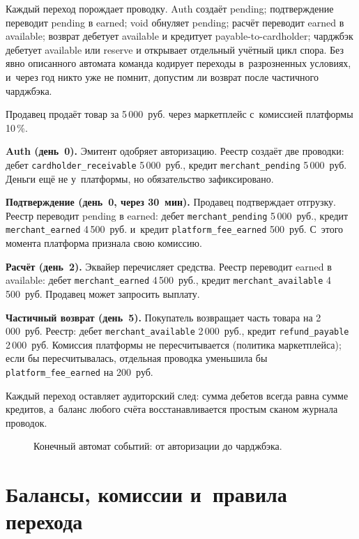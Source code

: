 Каждый переход порождает проводку. Auth создаёт pending; подтверждение
переводит pending в earned; void обнуляет pending; расчёт переводит
earned в available; возврат дебетует available и кредитует
payable-to-cardholder; чарджбэк дебетует available или reserve
и открывает отдельный учётный цикл спора. Без явно описанного автомата
команда кодирует переходы в~разрозненных условиях, и~через год никто
уже не помнит, допустим ли возврат после частичного чарджбэка.

Продавец продаёт товар за 5\,000~руб. через маркетплейс с~комиссией
платформы 10\,\%.

\textbf{Auth (день~0).} Эмитент одобряет авторизацию. Реестр
создаёт две проводки: дебет \texttt{cardholder\_receivable}
5\,000~руб., кредит \texttt{merchant\_pending} 5\,000~руб.
Деньги ещё не у~платформы, но обязательство зафиксировано.

\textbf{Подтверждение (день~0, через 30~мин).} Продавец подтверждает
отгрузку. Реестр переводит pending в earned: дебет
\texttt{merchant\_pending} 5\,000~руб., кредит
\texttt{merchant\_earned} 4\,500~руб. и~кредит
\texttt{platform\_fee\_earned} 500~руб. С~этого момента
платформа признала свою комиссию.

\textbf{Расчёт (день~2).} Эквайер перечисляет средства.
Реестр переводит earned в available: дебет
\texttt{merchant\_earned} 4\,500~руб., кредит
\texttt{merchant\_available} 4\,500~руб. Продавец может
запросить выплату.

\textbf{Частичный возврат (день~5).} Покупатель возвращает часть
товара на 2\,000~руб. Реестр: дебет \texttt{merchant\_available}
2\,000~руб., кредит \texttt{refund\_payable} 2\,000~руб.
Комиссия платформы не пересчитывается (политика маркетплейса);
если бы пересчитывалась, отдельная проводка уменьшила бы
\texttt{platform\_fee\_earned} на 200~руб.

Каждый переход оставляет аудиторский след: сумма дебетов
всегда равна сумме кредитов, а~баланс любого счёта
восстанавливается простым сканом журнала проводок.

\begin{figure}[tbp]
  \centering
  \caption{Конечный автомат событий: от авторизации до чарджбэка.}\label{fig:event-state-machine}
\end{figure}

\section{Балансы, комиссии и~правила перехода}\label{sec:ledger-balances}

